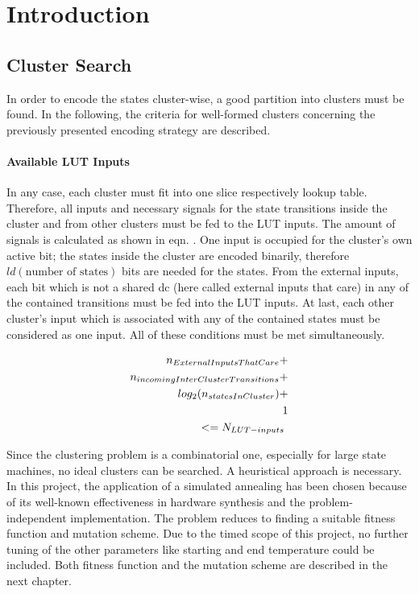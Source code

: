 \chapter{Introduction}
\label{cha:introduction}





\section{Cluster Search}
\label{sec:clusterSearch}

In order to encode the states cluster-wise, a good partition into clusters must be found. In the following, the criteria for well-formed 
clusters concerning the previously presented encoding strategy are described.

\subsubsection{Available LUT Inputs}
\label{subsubsec:LUTInputs}
In any case, each cluster must fit into one slice respectively lookup table. Therefore, all inputs and necessary signals for the state 
transitions inside the cluster and from other clusters must be fed to the LUT inputs. The amount of signals is calculated as shown in eqn. 
\label{eqn:formula}. One input is occupied for the cluster's own active bit; the states inside the cluster are encoded binarily, therefore 
$ld(\text{number of states})$ bits are needed for the states. From the external inputs, each bit which is not a shared dc (here called external inputs that care) in any of the contained
transitions must be fed into the LUT inputs. At last, each other cluster's input which is associated with any of the contained states must 
be considered as one input. All of these conditions must be met simultaneously.

\begin{center}
\begin{eqnarray}
n_{ExternalInputsThatCare} + \\
n_{incomingInterClusterTransitions} + \\
log_2(n_{statesInCluster}) + \\
1\vspace{1cm}\\
<= N_{LUT-inputs}\
\end{eqnarray}
\end{center}


Since the clustering problem is a combinatorial one, especially for large state machines, no ideal clusters can be searched. A heuristical 
approach is necessary. In this project, the application of a simulated annealing has been chosen because of its well-known effectiveness in
hardware synthesis and the problem-independent implementation. The problem reduces to finding a suitable fitness function and mutation scheme.
Due to the timed scope of this project, no further tuning of the other parameters like starting and end temperature could be included. Both 
fitness function and the mutation scheme are described in the next chapter.

